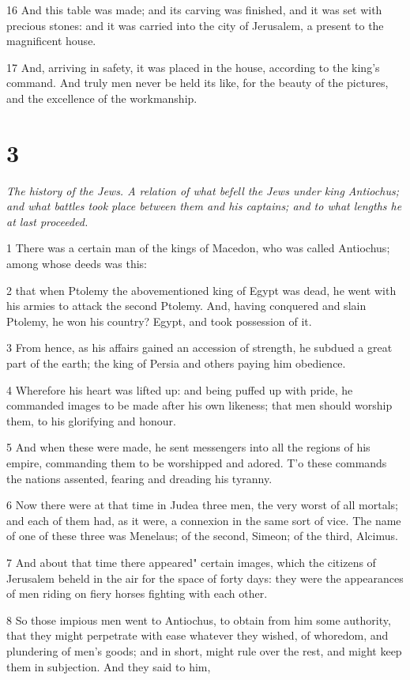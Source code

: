 16 And this table was made; and its carving was finished, and it was set with precious stones: and it was carried into the city of Jerusalem, a present to the magnificent house. 

17 And, arriving in safety, it was placed in the house, according to the king’s command. And truly men never be held its like, for the beauty of the pictures, and the excellence of the workmanship. 

\chapter{3}

\par \textit{The history of the Jews. A relation of what befell the Jews under king Antiochus; and what battles took place between them and his captains; and to what lengths he at last proceeded.}

1 There was a certain man of the kings of Macedon, who was called Antiochus; among whose deeds was this: 

2 that when Ptolemy the abovementioned king of Egypt was dead, he went with his armies to attack the second Ptolemy. And, having conquered and slain Ptolemy, he won his country? Egypt, and took possession of it. 

3 From hence, as his affairs gained an accession of strength, he subdued a great part of the earth; the king of Persia and others paying him obedience. 

4 Wherefore his heart was lifted up: and being puffed up with pride, he commanded images to be made after his own likeness; that men should worship them, to his glorifying and honour. 

5 And when these were made, he sent messengers into all the regions of his empire, commanding them to be worshipped and adored. T’o these commands the nations assented, fearing and dreading his tyranny. 

6 Now there were at that time in Judea three men, the very worst of all mortals; and each of them had, as it were, a connexion in the same sort of vice. The name of one of these three was Menelaus; of the second, Simeon; of the third, Alcimus. 

7 And about that time there appeared" certain images, which the citizens of Jerusalem beheld in the air for the space of forty days: they were the appearances of men riding on fiery horses fighting with each other. 

8 So those impious men went to Antiochus, to obtain from him some authority, that they might perpetrate with ease whatever they wished, of whoredom, and plundering of men’s goods; and in short, might rule over the rest, and might keep them in subjection. And they said to him, 

